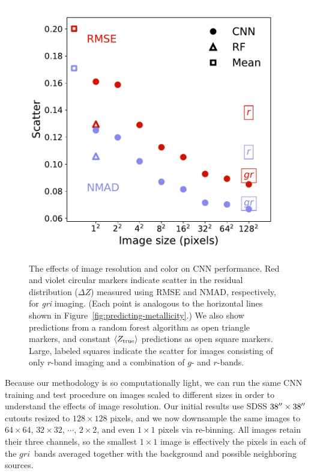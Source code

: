 \documentclass[fleqn,usenatbib]{mnras}
\newcommand{\sdssg}{\hbox{$g$}}
\newcommand{\sdssr}{\hbox{$r$}}
\newcommand{\sdssi}{\hbox{$i$}}
\begin{document}
\begin{figure}
	\includegraphics[width=\columnwidth]{04-resolution-revised.pdf}
	\caption{\label{fig:resolution}
		The effects of image resolution and color on CNN performance. Red and violet circular markers indicate scatter in the residual distribution ($\Delta Z$) measured using RMSE and NMAD, respectively, for \textit{gri} imaging. (Each point is analogous to the horizontal lines shown in Figure~\ref{fig:predicting-metallicity}.) We also show predictions from a random forest algorithm as open triangle markers, and constant $\langle Z_{\rm true}\rangle$ predictions as open square markers. Large, labeled squares indicate the scatter for images consisting of only \sdssr-band imaging and a combination of \sdssg- and \sdssr-bands.}
\end{figure}

Because our methodology is so computationally light, we can run the same CNN training and test procedure on images scaled to different sizes in order to understand the effects of image resolution. Our initial results use SDSS $38\hbox{$^{\prime\prime}$} \times 38 \hbox{$^{\prime\prime}$}$ cutouts resized to $128\times 128$ pixels, and we now downsample the same images to $64\times 64$, $32 \times 32$, $\cdots$, $2\times 2$, and even $1\times 1$ pixels via re-binning. All images retain their three channels, so the smallest $1 \times 1$ image is effectively the pixels in each of the \sdssg\sdssr\sdssi\ bands averaged together with the background and possible neighboring sources.
\end{document}
